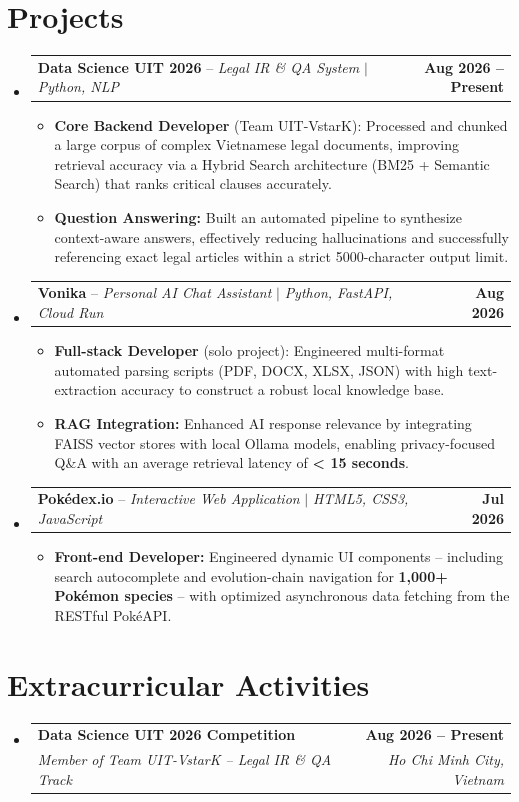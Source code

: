 \documentclass[letterpaper,11pt]{article}
\makeatletter
\newcommand{\resumeItem}[1]{
  \item\small{
    {#1 \vspace{-2pt}}
  }
}
\newcommand{\resumeEduHeading}[4]{
  \vspace{-2pt}\item
    \begin{tabular*}{1.0\textwidth}[t]{l@{\extracolsep{\fill}}r}
      \textbf{#1} & \textbf{#2} \\
      \textit{\small#3} & \textit{\small #4} \\
    \end{tabular*}\vspace{-7pt}
}
\newcommand{\resumeProjectHeading}[2]{
    \item
    \begin{tabular*}{1.0\textwidth}{l@{\extracolsep{\fill}}r}
      \small#1 & \textbf{#2} \\
    \end{tabular*}\vspace{-7pt}
}
\newcommand{\resumeSubHeadingListStart}{\begin{itemize}[leftmargin=0.0in, label={}]}
\newcommand{\resumeSubHeadingListEnd}{\end{itemize}}
\newcommand{\resumeItemListStart}{\begin{itemize}}
\newcommand{\resumeItemListEnd}{\end{itemize}\vspace{-5pt}}
\makeatother
\begin{document}
\section{Projects}
    \resumeSubHeadingListStart
      \resumeProjectHeading
          {\textbf{Data Science UIT 2026} -- \emph{Legal IR \& QA System} $|$ \emph{Python, NLP}}{Aug 2026 -- Present}
          \resumeItemListStart
            \resumeItem{\textbf{Core Backend Developer} (Team UIT-VstarK): Processed and chunked a large corpus of complex Vietnamese legal documents, improving retrieval accuracy via a Hybrid Search architecture (BM25 + Semantic Search) that ranks critical clauses accurately.}
            \resumeItem{\textbf{Question Answering:} Built an automated pipeline to synthesize context-aware answers, effectively reducing hallucinations and successfully referencing exact legal articles within a strict 5000-character output limit.}
          \resumeItemListEnd
          
      \resumeProjectHeading
          {\textbf{Vonika} -- \emph{Personal AI Chat Assistant} $|$ \emph{Python, FastAPI, Cloud Run}}{Aug 2026}
          \resumeItemListStart
            \resumeItem{\textbf{Full-stack Developer} (solo project): Engineered multi-format automated parsing scripts (PDF, DOCX, XLSX, JSON) with high text-extraction accuracy to construct a robust local knowledge base.}
            \resumeItem{\textbf{RAG Integration:} Enhanced AI response relevance by integrating FAISS vector stores with local Ollama models, enabling privacy-focused Q\&A with an average retrieval latency of \textbf{< 15 seconds}.}
          \resumeItemListEnd
          
      \resumeProjectHeading
          {\textbf{Pokédex.io} -- \emph{Interactive Web Application} $|$ \emph{HTML5, CSS3, JavaScript}}{Jul 2026}
          \resumeItemListStart
            \resumeItem{\textbf{Front-end Developer:} Engineered dynamic UI components -- including search autocomplete and evolution-chain navigation for \textbf{1,000+ Pokémon species} -- with optimized asynchronous data fetching from the RESTful PokéAPI.}
          \resumeItemListEnd
    \resumeSubHeadingListEnd

\section{Extracurricular Activities}
  \resumeSubHeadingListStart
    \resumeEduHeading
      {Data Science UIT 2026 Competition}{Aug 2026 -- Present}
      {Member of Team UIT-VstarK -- Legal IR \& QA Track}{Ho Chi Minh City, Vietnam}
  \resumeSubHeadingListEnd
\end{document}
